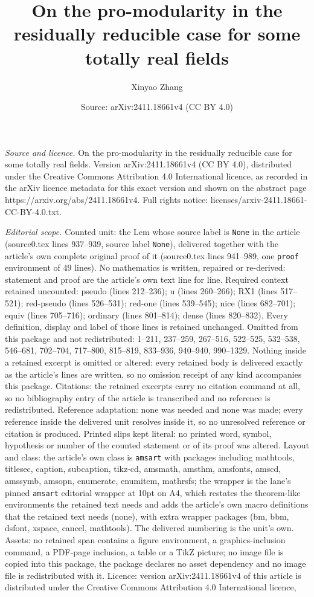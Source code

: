 \documentclass[10pt,a4paper]{amsart}
\title[On the pro-modularity in the residually reducible case for s]{On the pro-modularity in the residually reducible case for some totally real fields}
\author{Xinyao Zhang}
\date{Source: arXiv:2411.18661v4 (CC BY 4.0)}
\begin{document}
\maketitle

\noindent\emph{Source and licence.} On the pro-modularity in the residually reducible case for some totally real fields. Version arXiv:2411.18661v4 (CC BY 4.0), distributed under the Creative Commons Attribution 4.0 International licence, as recorded in the arXiv licence metadata for this exact version and shown on the abstract page https://arxiv.org/abs/2411.18661v4. Full rights notice: licenses/arxiv-2411.18661-CC-BY-4.0.txt.\par\smallskip

\noindent\textit{Editorial scope.} Counted unit: the Lem whose source label is \texttt{None} in the article (source0.tex lines 937--939, source label \texttt{None}), delivered together with the article's own complete original proof of it (source0.tex lines 941--989, one \texttt{proof} environment of 49 lines). No mathematics is written, repaired or re-derived: statement and proof are the article's own text line for line. Required context retained uncounted: pseudo (lines 212--236); u (lines 260--266); RX1 (lines 517--521); red-pseudo (lines 526--531); red-one (lines 539--545); nice (lines 682--701); equiv (lines 705--716); ordinary (lines 801--814); dense (lines 820--832). Every definition, display and label of those lines is retained unchanged. Omitted from this package and not redistributed: 1--211, 237--259, 267--516, 522--525, 532--538, 546--681, 702--704, 717--800, 815--819, 833--936, 940--940, 990--1329. Nothing inside a retained excerpt is omitted or altered: every retained body is delivered exactly as the article's lines are written, so no omission receipt of any kind accompanies this package. Citations: the retained excerpts carry no citation command at all, so no bibliography entry of the article is transcribed and no reference is redistributed. Reference adaptation: none was needed and none was made; every reference inside the delivered unit resolves inside it, so no unresolved reference or citation is produced. Printed slips kept literal: no printed word, symbol, hypothesis or number of the counted statement or of its proof was altered. Layout and class: the article's own class is \texttt{amsart} with packages including mathtools, titlesec, caption, subcaption, tikz-cd, amsmath, amsthm, amsfonts, amscd, amssymb, amsopn, enumerate, enumitem, mathrsfs; the wrapper is the lane's pinned \texttt{amsart} editorial wrapper at 10pt on A4, which restates the theorem-like environments the retained text needs and adds the article's own macro definitions that the retained text needs (none), with extra wrapper packages (bm, bbm, dsfont, xspace, cancel, mathtools). The delivered numbering is the unit's own. Assets: no retained span contains a figure environment, a graphics-inclusion command, a PDF-page inclusion, a table or a TikZ picture; no image file is copied into this package, the package declares no asset dependency and no image file is redistributed with it. Licence: version arXiv:2411.18661v4 of this article is distributed under the Creative Commons Attribution 4.0 International licence, 
\end{document}
